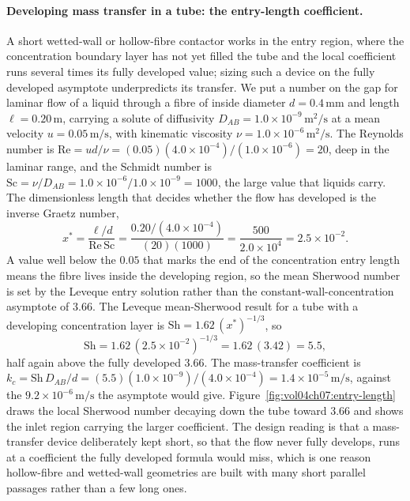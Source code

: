 \paragraph{Developing mass transfer in a tube: the entry-length coefficient.}
A short wetted-wall or hollow-fibre contactor works in the entry region,
where the concentration boundary layer has not yet filled the tube and the
local coefficient runs several times its fully developed value; sizing such a
device on the fully developed asymptote underpredicts its transfer. We put a
number on the gap for laminar flow of a liquid through a fibre of inside
diameter $d = 0.4\,\si{\milli\meter}$ and length $\ell = 0.20\,\si{\meter}$,
carrying a solute of diffusivity $D_{AB} = 1.0\times 10^{-9}\,\si{
\meter\squared\per\second}$ at a mean velocity $u = 0.05\,\text{m/s}$, with
kinematic viscosity $\nu = 1.0\times 10^{-6}\,\si{\meter\squared\per\second}$.
The Reynolds number is $\text{Re} = ud/\nu = (0.05)(4.0\times 10^{-4})/
(1.0\times 10^{-6}) = 20$, deep in the laminar range, and the Schmidt number
is $\text{Sc} = \nu/D_{AB} = 1.0\times 10^{-6}/1.0\times 10^{-9} = 1000$, the
large value that liquids carry. The dimensionless length that decides whether
the flow has developed is the inverse Graetz number,
\[
x^{*} = \frac{\ell/d}{\text{Re}\,\text{Sc}} = \frac{0.20/(4.0\times 10^{-4})}
{(20)(1000)} = \frac{500}{2.0\times 10^{4}} = 2.5\times 10^{-2}.
\]
A value well below the $0.05$ that marks the end of the concentration entry
length means the fibre lives inside the developing region, so the mean
Sherwood number is set by the Leveque entry solution rather than the
constant-wall-concentration asymptote of $3.66$. The Leveque mean-Sherwood
result for a tube with a developing concentration layer is $\text{Sh} =
1.62\,(x^{*})^{-1/3}$, so
\[
\text{Sh} = 1.62\,(2.5\times 10^{-2})^{-1/3} = 1.62\,(3.42) = 5.5,
\]
half again above the fully developed $3.66$. The mass-transfer coefficient is
$k_c = \text{Sh}\,D_{AB}/d = (5.5)(1.0\times 10^{-9})/(4.0\times 10^{-4}) =
1.4\times 10^{-5}\,\text{m/s}$, against the $9.2\times 10^{-6}\,\text{m/s}$
the asymptote would give. Figure~\ref{fig:vol04ch07:entry-length} draws the
local Sherwood number decaying down the tube toward $3.66$ and shows the
inlet region carrying the larger coefficient. The design reading is that a
mass-transfer device deliberately kept short, so that the flow never fully
develops, runs at a coefficient the fully developed formula would miss, which
is one reason hollow-fibre and wetted-wall geometries are built with many
short parallel passages rather than a few long ones.

